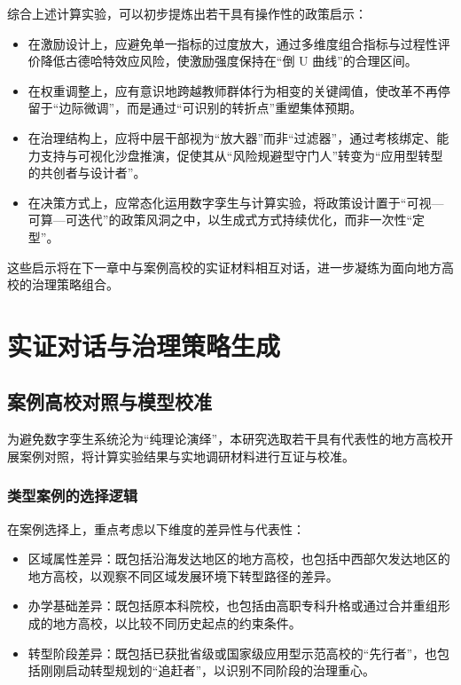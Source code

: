 \documentclass[UTF8, zihao=-4, fontset=mac]{ctexart}
\begin{document}
综合上述计算实验，可以初步提炼出若干具有操作性的政策启示：

\begin{itemize}
    \item 在激励设计上，应避免单一指标的过度放大，通过多维度组合指标与过程性评价降低古德哈特效应风险，使激励强度保持在“倒 U 曲线”的合理区间。
    \item 在权重调整上，应有意识地跨越教师群体行为相变的关键阈值，使改革不再停留于“边际微调”，而是通过“可识别的转折点”重塑集体预期。
    \item 在治理结构上，应将中层干部视为“放大器”而非“过滤器”，通过考核绑定、能力支持与可视化沙盘推演，促使其从“风险规避型守门人”转变为“应用型转型的共创者与设计者”。
    \item 在决策方式上，应常态化运用数字孪生与计算实验，将政策设计置于“可视—可算—可迭代”的政策风洞之中，以生成式方式持续优化，而非一次性“定型”。
\end{itemize}

这些启示将在下一章中与案例高校的实证材料相互对话，进一步凝练为面向地方高校的治理策略组合。

\section{实证对话与治理策略生成}

\subsection{案例高校对照与模型校准}

为避免数字孪生系统沦为“纯理论演绎”，本研究选取若干具有代表性的地方高校开展案例对照，将计算实验结果与实地调研材料进行互证与校准。

\subsubsection{类型案例的选择逻辑}

在案例选择上，重点考虑以下维度的差异性与代表性：

\begin{itemize}
    \item 区域属性差异：既包括沿海发达地区的地方高校，也包括中西部欠发达地区的地方高校，以观察不同区域发展环境下转型路径的差异。
    \item 办学基础差异：既包括原本科院校，也包括由高职专科升格或通过合并重组形成的地方高校，以比较不同历史起点的约束条件。
    \item 转型阶段差异：既包括已获批省级或国家级应用型示范高校的“先行者”，也包括刚刚启动转型规划的“追赶者”，以识别不同阶段的治理重心。
\end{itemize}
\end{document}
